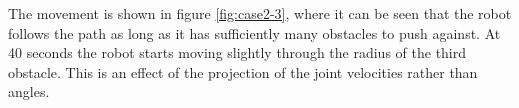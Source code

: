 The movement is shown in figure \ref{fig:case2-3}, where it can be seen that the robot follows the path as long as it has sufficiently many obstacles to push against. At 40 seconds the robot starts moving slightly through the radius of the third obstacle. This is an effect of the projection of the joint velocities rather than angles.

\begin{figure}
    \centering
    
    \hfil
    

\end{figure}
